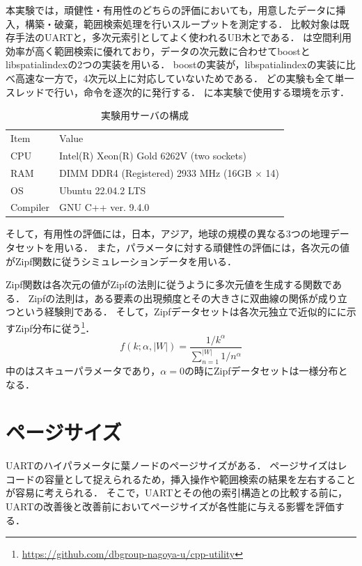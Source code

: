 本実験では，頑健性・有用性のどちらの評価においても，用意したデータに挿入，構築・破棄，範囲検索処理を行いスループットを測定する．
比較対象は既存手法のUARTと，多次元索引としてよく使われるUB木と\RTree である．
\RTree は空間利用効率が高く範囲検索に優れており，データの次元数に合わせてboostとlibspatialindexの2つの実装を用いる．
boostの実装が，libspatialindexの実装に比べ高速な一方で，4次元以上に対応していないためである．
どの実験も全て単一スレッドで行い，命令を逐次的に発行する．
\Tab{\ref{tab:environment}}に本実験で使用する環境を示す．

\begin{table}[tb]
  \caption{実験用サーバの構成}
  \label{tab:environment}
  \centering
  \begin{tabular}{ll}
    \toprule
    Item     & Value                                              \\
    \cmidrule(r){1-1}
    \cmidrule(l){2-2}
    CPU      & Intel(R) Xeon(R) Gold 6262V (two sockets)          \\
    RAM      & DIMM DDR4 (Registered) 2933 MHz (16GB $\times$ 14) \\
    OS       & Ubuntu 22.04.2 LTS                                 \\
    Compiler & GNU C++ ver. 9.4.0                                 \\
    \bottomrule
  \end{tabular}
\end{table}

そして，有用性の評価には，日本，アジア，地球の規模の異なる3つの地理データセットを用いる．
また，パラメータに対する頑健性の評価には，各次元の値がZipf関数に従うシミュレーションデータを用いる．

Zipf関数は各次元の値がZipfの法則に従うように多次元値を生成する関数である．
Zipfの法則は，ある要素の出現頻度とその大きさに双曲線の関係が成り立つという経験則である．
そして，Zipfデータセットは各次元独立で近似的に\Eq{\ref{eq:zipf}}に示すZipf分布に従う\footnote{\footnotesize\url{https://github.com/dbgroup-nagoya-u/cpp-utility}}．
\begin{equation}
  \label{eq:zipf}
  f(k; \alpha, |W|) = \frac{1 / k^{\alpha}}{\sum_{n = 1}^{|W|} 1 / n^{\alpha}}
\end{equation}
\Eq{\ref{eq:zipf}}中の\alpha はスキューパラメータであり，$\alpha = 0$の時にZipfデータセットは一様分布となる．

\section{ページサイズ}
UARTのハイパラメータに葉ノードのページサイズがある．
ページサイズはレコードの容量として捉えられるため，挿入操作や範囲検索の結果を左右することが容易に考えられる．
そこで，UARTとその他の索引構造との比較する前に，UARTの改善後と改善前においてページサイズが各性能に与える影響を評価する．

